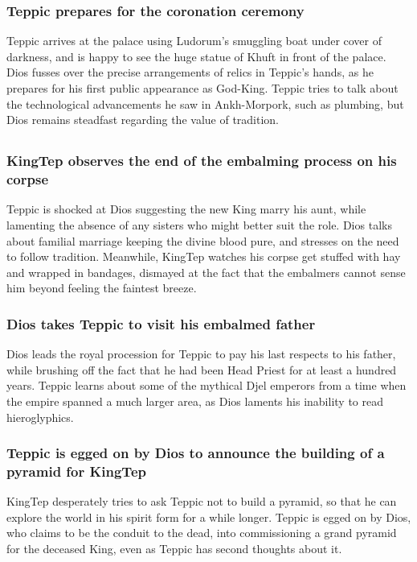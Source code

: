 \subsubsection{\Gls{Teppic} prepares for the coronation ceremony}
\Gls{Teppic} arrives at the palace using \Gls{Ludorum}'s smuggling boat under cover of darkness,
and is happy to see the huge statue of \Gls{Khuft} in front of the palace. \Gls{Dios} fusses over
the precise arrangements of relics in \Gls{Teppic}'s hands, as he prepares for his first public
appearance as God-King. \Gls{Teppic} tries to talk about the technological advancements he saw in
Ankh-Morpork, such as plumbing, but \Gls{Dios} remains steadfast regarding the value of tradition.

\subsection{}
\subsubsection{\Gls{KingTep} observes the end of the embalming process on his corpse}
\Gls{Teppic} is shocked at \Gls{Dios} suggesting the new King marry his aunt, while lamenting the
absence of any sisters who might better suit the role. \Gls{Dios} talks about familial marriage
keeping the divine blood pure, and stresses on the need to follow tradition. Meanwhile,
\Gls{KingTep} watches his corpse get stuffed with hay and wrapped in bandages, dismayed at the fact
that the embalmers cannot sense him beyond feeling the faintest breeze.

\subsubsection{\Gls{Dios} takes \Gls{Teppic} to visit his embalmed father}
\Gls{Dios} leads the royal procession for \Gls{Teppic} to pay his last respects to his father, while
brushing off the fact that he had been Head Priest for at least a hundred years. \Gls{Teppic} learns
about some of the mythical Djel emperors from a time when the empire spanned a much larger area,
as \Gls{Dios} laments his inability to read hieroglyphics.

\subsubsection{\Gls{Teppic} is egged on by \Gls{Dios} to announce the building of a pyramid for
    \Gls{KingTep}}
\Gls{KingTep} desperately tries to ask \Gls{Teppic} not to build a pyramid, so that he can explore
the world in his spirit form for a while longer. \Gls{Teppic} is egged on by \Gls{Dios}, who claims
to be the conduit to the dead, into commissioning a grand pyramid for the deceased King, even as
\Gls{Teppic} has second thoughts about it.

